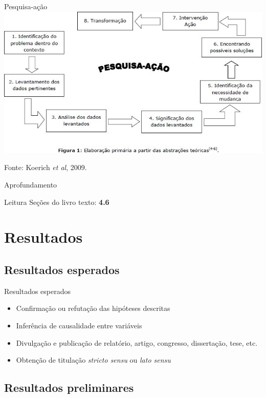 \documentclass{beamer}
\begin{document}
\begin{frame}{Pesquisa-ação}
  \includegraphics[width=\textwidth]{ProjetoI/pesquisa-acao}

  Fonte: Koerich {\em et al}, 2009.
\end{frame}

\begin{frame}{Aprofundamento}
  \begin{block}{Leitura}
    Seções do livro texto: {\bf 4.6}
  \end{block}
\end{frame}

\section{Resultados}

\subsection{Resultados esperados}

\begin{frame}{Resultados esperados}
  \begin{itemize}
  \item Confirmação ou refutação das hipóteses descritas
  \item Inferência de causalidade entre variáveis
  \item Divulgação e publicação de relatório, artigo, congresso,
    dissertação, tese, etc.
  \item Obtenção de titulação {\em stricto sensu} ou {\em lato sensu}
  \end{itemize}
\end{frame}

\subsection{Resultados preliminares}
\end{document}

